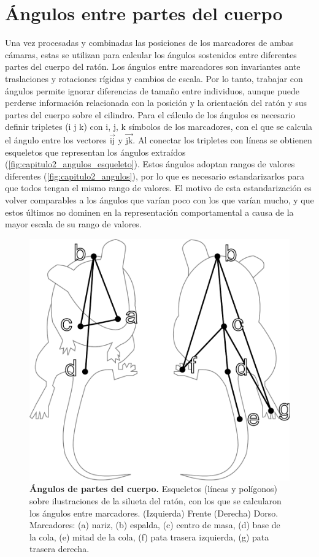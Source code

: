 \clearpage

\section{Ángulos entre partes del cuerpo}\label{sec:angulos_entre_partes}

Una vez procesadas y combinadas las posiciones de los marcadores de ambas cámaras, estas se utilizan para calcular los ángulos sostenidos entre diferentes partes del cuerpo del ratón. Los ángulos entre marcadores son invariantes ante traslaciones y rotaciones rígidas y cambios de escala. Por lo tanto, trabajar con ángulos permite ignorar diferencias de tamaño entre individuos, aunque puede perderse información relacionada con la posición y la orientación del ratón y sus partes del cuerpo sobre el cilindro. Para el cálculo de los ángulos es necesario definir tripletes (i j k) con i, j, k símbolos de los marcadores, con el que se calcula el ángulo entre los vectores $\vec{\mathrm{ij}}$ y $\vec{\mathrm{jk}}$. Al conectar los tripletes con líneas se obtienen esqueletos que representan los ángulos extraídos (\autoref{fig:capitulo2_angulos_esqueleto}). Estos ángulos adoptan rangos de valores diferentes (\autoref{fig:capitulo2_angulos}), por lo que es necesario estandarizarlos para que todos tengan el mismo rango de valores. El motivo de esta estandarización es volver comparables a los ángulos que varían poco con los que varían mucho, y que estos últimos no dominen en la representación comportamental a causa de la mayor escala de su rango de valores.

\begin{figure}[htbp]
    \centering
    \includegraphics[width=0.5\linewidth]{figuras/capitulo2/angulos_esqueleto.pdf}
    \caption{\textbf{Ángulos de partes del cuerpo.} Esqueletos (líneas y polígonos) sobre ilustraciones de la silueta del ratón, con los que se calcularon los ángulos entre marcadores.
        (Izquierda) Frente (Derecha) Dorso.
        Marcadores: (a) nariz, (b) espalda, (c) centro de masa, (d) base de la cola, (e) mitad de la cola, (f) pata trasera izquierda, (g) pata trasera derecha.}
    \label{fig:capitulo2_angulos_esqueleto}
\end{figure}

